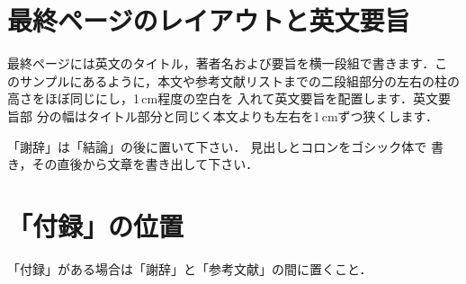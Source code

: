 \documentclass[dvipdfmx]{jsce}
\begin{document}
\lastpagecontrol[1cm]{13cm}

\section{最終ページのレイアウトと英文要旨}

最終ページには英文のタイトル，著者名および要旨を横一段組で書きます．こ
のサンプルにあるように，本文や参考文献リストまでの二段組部分の左右の柱の
高さをほぼ同じにし，1\,cm程度の空白を
入れて英文要旨を配置します．英文要旨部
分の幅はタイトル部分と同じく本文よりも左右を1\,cmずつ狭くします．

\ack 「謝辞」は「結論」の後に置いて下さい．
見出しとコロンをゴシック体で
書き，その直後から文章を書き出して下さい．

\appendix

\section{「付録」の位置}

「付録」がある場合は「謝辞」と「参考文献」の間に置くこと．




\lastpagesettings
\end{document}
